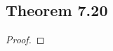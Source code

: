 \documentclass[../../main.tex]{subfiles}
\begin{document}
\subsection{Theorem 7.20}
\begin{wts}

\end{wts}
\begin{proof}

\end{proof}
\end{document}
